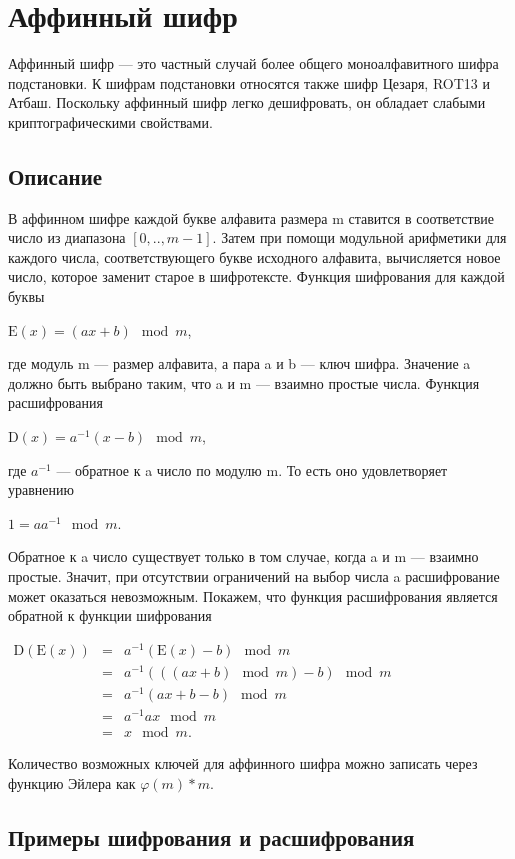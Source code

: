 \section{Аффинный шифр}

Аффинный шифр — это частный случай более общего моноалфавитного шифра 
подстановки. К шифрам подстановки относятся также шифр Цезаря, 
ROT13 и Атбаш. Поскольку аффинный шифр легко дешифровать, 
он обладает слабыми криптографическими свойствами.


\subsection{Описание}

В аффинном шифре каждой букве алфавита размера m ставится в 
соответствие число из диапазона $[0, .. ,m-1]$. 
Затем при помощи модульной арифметики для каждого числа, соответствующего 
букве исходного алфавита, вычисляется новое число, которое заменит 
старое в шифротексте. Функция шифрования для каждой буквы

    $\mbox{E}(x)=(ax+b)\mod{m}$,

где модуль m — размер алфавита, а пара a и b — ключ шифра. Значение 
a должно быть выбрано таким, что a и m — взаимно простые числа. Функция 
расшифрования

    $\mbox{D}(x)=a^{-1}(x-b)\mod{m}$,

где $a^{-1}$ — обратное к a число по модулю m. То есть оно удовлетворяет 
уравнению

    $1 = a a^{-1}\mod{m}$.

Обратное к a число существует только в том случае, когда a и m — взаимно 
простые. Значит, при отсутствии ограничений на выбор числа a расшифрование 
может оказаться невозможным. Покажем, что функция расшифрования является 
обратной к функции шифрования


    $\begin{matrix}\mbox{D}(\mbox{E}(x)) &= &a^{-1}(\mbox{E}(x)-b)\mod{m}\\ &= &a^{-1}(((ax+b)\mod{m})-b)\mod{m} \\ &= &a^{-1}(ax+b-b)\mod{m} \\ &= &a^{-1}ax \mod{m}\\ & = &x\mod{m}. \end{matrix}$

Количество возможных ключей для аффинного шифра можно записать 
через функцию Эйлера как $\varphi(m)*m$.


\subsection{Примеры шифрования и расшифрования}

